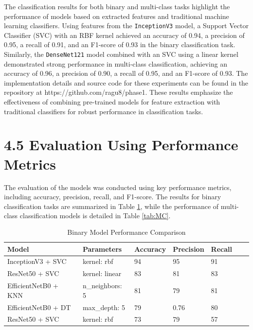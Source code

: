 \documentclass[12pt,a4paper]{report}
\begin{document}
\hspace{1cm}The classification results for both binary and multi-class tasks highlight the performance of models based on extracted features and traditional machine learning classifiers. Using features from the \texttt{InceptionV3} model, a Support Vector Classifier (SVC) with an RBF kernel achieved an accuracy of 0.94, a precision of 0.95, a recall of 0.91, and an F1-score of 0.93 in the binary classification task. Similarly, the \texttt{DenseNet121} model combined with an SVC using a linear kernel demonstrated strong performance in multi-class classification, achieving an accuracy of 0.96, a precision of 0.90, a recall of 0.95, and an F1-score of 0.93. The implementation details and source code for these experiments can be found in the repository at https://github.com/ragu8/phase1. These results emphasize the effectiveness of combining pre-trained models for feature extraction with traditional classifiers for robust performance in classification tasks.


\section*{4.5 Evaluation Using Performance Metrics}

\hspace{1cm}The evaluation of the models was conducted using key performance metrics, including accuracy, precision, recall, and F1-score. The results for binary classification tasks are summarized in Table \ref{tab:BC}, while the performance of multi-class classification models is detailed in Table \ref{tab:MC}. 

\renewcommand{\arraystretch}{1.9} %
\begin{table}[ht]
	\renewcommand\thetable{4.2}
	\centering
	\caption{Binary Model Performance Comparison}
	\begin{tabular}{|l|l|l|l|l|l|l|}
		\hline
		\textbf{ Model}  & \textbf{Parameters} & \textbf{Accuracy} & \textbf{Precision} & \textbf{Recall}  \\ \hline
		InceptionV3 + SVC &   kernel: rbf & 94 & 95 & 91  \\ \hline
		ResNet50 + SVC &   kernel: linear & 83 & 81 & 83  \\ \hline
		EfficientNetB0 + KNN &   n\_neighbors: 5 & 81 & 79 & 81  \\ \hline
		EfficientNetB0 + DT &   max\_depth: 5 & 79 & 0.76 & 80  \\ \hline
		ResNet50 + SVC &   kernel: rbf & 73 & 79 & 57  \\ \hline
	\end{tabular}
	
	\label{tab:BC}
\end{table}
\end{document}

